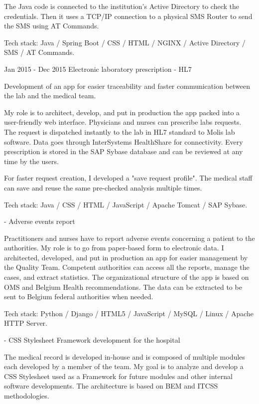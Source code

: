 \begin{cventries}
{The Java code is connected to the institution's Active Directory to check the credentials. Then it uses a TCP/IP connection to a physical SMS Router to send the SMS using AT Commands.

Tech stack: Java / Spring Boot / CSS / HTML / NGINX / Active Directory / SMS / AT Commands.

    }
    
    
    
    
  \cventry
    {Jan 2015 - Dec 2015} %
    {Electronic laboratory prescription - HL7} %
    {} %
    {} %
    {
Development of an app for easier traceability and faster communication between the lab and the medical team.

My role is to architect, develop, and put in production the app packed into a user-friendly web interface. 
Physicians and nurses can prescribe labs requests. The request is dispatched instantly to the lab in HL7 standard to Molis lab software. Data goes through InterSystems HealthShare for connectivity. 
Every prescription is stored in the SAP Sybase database and can be reviewed at any time by the users.

For faster request creation, I developed a "save request profile". The medical staff can save and reuse the same pre-checked analysis multiple times.

Tech stack: Java / CSS / HTML / JavaScript / Apache Tomcat / SAP Sybase.

    }
    
    
    
    
  \cventry
    {-} %
    {Adverse events report} %
    {} %
    {} %
    {
Practitioners and nurses have to report adverse events concerning a patient to the authorities.
My role is to go from paper-based form to electronic data.
I architected, developed, and put in production an app for easier management by the Quality Team.
Competent authorities can access all the reports, manage the cases, and extract statistics.
The organizational structure of the app is based on OMS and Belgium Health recommendations.
The data can be extracted to be sent to Belgium federal authorities when needed.

Tech stack: Python / Django / HTML5 / JavaScript / MySQL / Linux / Apache HTTP Server.

    }
    
    
  \cventry
    {-} %
    {CSS Stylesheet Framework development for the hospital} %
    {} %
    {} %
    {
The medical record is developed in-house and is composed of multiple modules each developed by a member of the team.
My goal is to analyze and develop a CSS Stylesheet used as a Framework for future modules and other internal software developments.
The architecture is based on BEM and ITCSS methodologies. 

}
\end{cventries}
